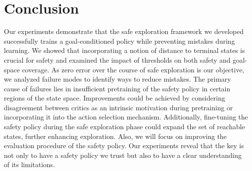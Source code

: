 \section{Conclusion}

Our experiments demonstrate that the safe exploration framework we developed successfully trains a goal-conditioned policy while preventing mistakes during learning. We showed that incorporating a notion of distance to terminal states is crucial for safety and examined the impact of thresholds on both safety and goal-space coverage. As zero error over the course of safe exploration is our objective, we analyzed failure modes to identify ways to reduce mistakes. The primary cause of failures lies in insufficient pretraining of the safety policy in certain regions of the state space. Improvements could be achieved by considering disagreement between critics as an intrinsic motivation during pretraining or incorporating it into the action selection mechanism. 
Additionally, fine-tuning the safety policy during the safe exploration phase could expand the set of reachable states, further enhancing exploration. Also, we will focus on improving the evaluation procedure of the safety policy. Our experiments reveal that the key is not only to have a safety policy we trust but also to have a clear understanding of its limitations.

